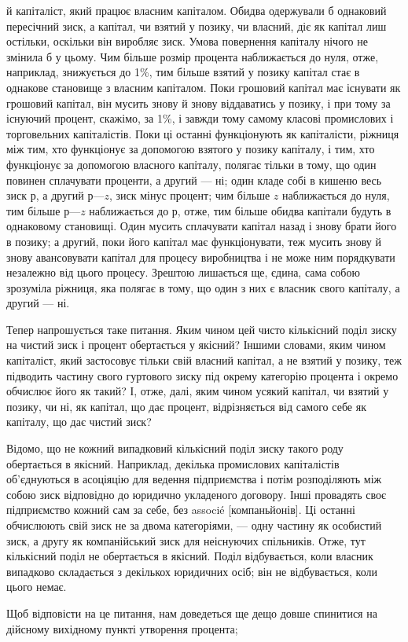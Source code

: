 \parcont{}  %
й капіталіст, який працює власним капіталом. Обидва одержували
б однаковий пересічний зиск, а капітал, чи взятий у позику,
чи власний, діє як капітал лиш остільки, оскільки він
виробляє зиск. Умова повернення капіталу нічого не змінила б
у цьому. Чим більше розмір процента наближається до нуля,
отже, наприклад, знижується до 1\%, тим більше взятий у позику
капітал стає в однакове становище з власним капіталом.
Поки грошовий капітал має існувати як грошовий капітал,
він мусить знову й знову віддаватись у позику, і при тому
за існуючий процент, скажімо, за 1\%, і завжди тому самому
класові промислових і торговельних капіталістів. Поки ці останні
функціонують як капіталісти, ріжниця між тим, хто функціонує
за допомогою взятого у позику капіталу, і тим, хто функціонує за
допомогою власного капіталу, полягає тільки в тому, що один
повинен сплачувати проценти, а другий — ні; один кладе собі в
кишеню весь зиск $р$, а другий $р — z$, зиск мінус процент; чим
більше $z$ наближається до нуля, тим більше $р — z$ наближається
до $р$, отже, тим більше обидва капітали будуть в однаковому
становищі. Один мусить сплачувати капітал назад і знову брати
його в позику; а другий, поки його капітал має функціонувати,
теж мусить знову й знову авансовувати капітал для процесу
виробництва і не може ним порядкувати незалежно від цього
процесу. Зрештою лишається ще, єдина, сама собою зрозуміла
ріжниця, яка полягає в тому, що один з них є власник свого капіталу,
а другий — ні.

Тепер напрошується таке питання. Яким чином цей чисто
кількісний поділ зиску на чистий зиск і процент обертається
у якісний? Іншими словами, яким чином капіталіст, який застосовує
тільки свій власний капітал, а не взятий у позику, теж
підводить частину свого гуртового зиску під окрему категорію
процента і окремо обчислює його як такий? І, отже, далі, яким
чином усякий капітал, чи взятий у позику, чи ні, як капітал,
що дає процент, відрізняється від самого себе як капіталу, що
дає чистий зиск?

Відомо, що не кожний випадковий кількісний поділ зиску
такого роду обертається в якісний. Наприклад, декілька промислових
капіталістів об’єднуються в асоціяцію для ведення підприємства
і потім розподіляють між собою зиск відповідно до
юридично укладеного договору. Інші провадять своє підприємство
кожний сам за себе, без associé [компаньйонів]. Ці останні
обчислюють свій зиск не за двома категоріями, — одну частину
як особистий зиск, а другу як компанійський зиск для неіснуючих
спільників. Отже, тут кількісний поділ не обертається
в якісний. Поділ відбувається, коли власник випадково складається
з декількох юридичних осіб; він не відбувається, коли
цього немає.

Щоб відповісти на це питання, нам доведеться ще дещо довше
спинитися на дійсному вихідному пункті утворення процента;
\parbreak{}  %
